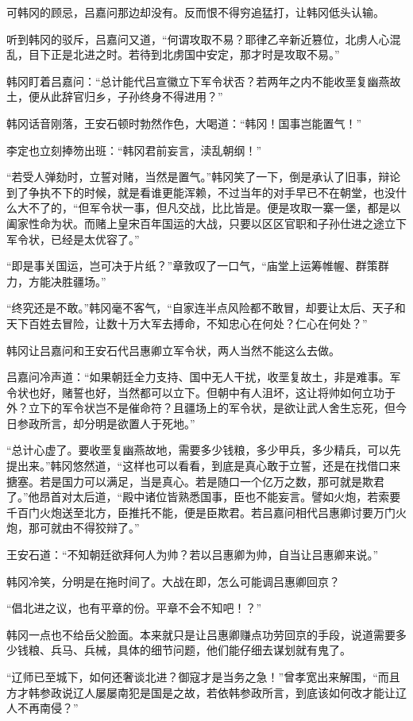 可韩冈的顾忌，吕嘉问那边却没有。反而恨不得穷追猛打，让韩冈低头认输。

听到韩冈的驳斥，吕嘉问又道，“何谓攻取不易？耶律乙辛新近篡位，北虏人心混乱，目下正是北进之时。若待到北虏国中安定，那才时是攻取不易。”

韩冈盯着吕嘉问：“总计能代吕宣徽立下军令状否？若两年之内不能收垩复幽燕故土，便从此辞官归乡，子孙终身不得进用？”

韩冈话音刚落，王安石顿时勃然作色，大喝道：“韩冈！国事岂能置气！”

李定也立刻捧笏出班：“韩冈君前妄言，渎乱朝纲！”

“若受人弹劾时，立誓对赌，当然是置气。”韩冈笑了一下，倒是承认了旧事，辩论到了争执不下的时候，就是看谁更能浑赖，不过当年的对手早已不在朝堂，也没什么大不了的，“但军令状一事，但凡交战，比比皆是。便是攻取一寨一堡，都是以阖家性命为状。而赌上皇宋百年国运的大战，只要以区区官职和子孙仕进之途立下军令状，已经是太优容了。”

“即是事关国运，岂可决于片纸？”章敦叹了一口气，“庙堂上运筹帷幄、群策群力，方能决胜疆场。”

“终究还是不敢。”韩冈毫不客气，“自家连半点风险都不敢冒，却要让太后、天子和天下百姓去冒险，让数十万大军去搏命，不知忠心在何处？仁心在何处？”

韩冈让吕嘉问和王安石代吕惠卿立军令状，两人当然不能这么去做。

吕嘉问冷声道：“如果朝廷全力支持、国中无人干扰，收垩复故土，非是难事。军令状也好，赌誓也好，当然都可以立下。但朝中有人沮坏，这让将帅如何立功于外？立下的军令状岂不是催命符？且疆场上的军令状，是欲让武人舍生忘死，但今日参政所言，却分明是欲置人于死地。”

“总计心虚了。要收垩复幽燕故地，需要多少钱粮，多少甲兵，多少精兵，可以先提出来。”韩冈悠然道，“这样也可以看看，到底是真心敢于立誓，还是在找借口来搪塞。若是国力可以满足，当是真心。若是随口一个亿万之数，那可就是欺君了。”他昂首对太后道，“殿中诸位皆熟悉国事，臣也不能妄言。譬如火炮，若索要千百门火炮送至北方，臣推托不能，便是臣欺君。若吕嘉问相代吕惠卿讨要万门火炮，那可就由不得狡辩了。”

王安石道：“不知朝廷欲拜何人为帅？若以吕惠卿为帅，自当让吕惠卿来说。”

韩冈冷笑，分明是在拖时间了。大战在即，怎么可能调吕惠卿回京？

“倡北进之议，也有平章的份。平章不会不知吧！？”

韩冈一点也不给岳父脸面。本来就只是让吕惠卿赚点功劳回京的手段，说道需要多少钱粮、兵马、兵械，具体的细节问题，他们能仔细去谋划就有鬼了。

“辽师已至城下，如何还奢谈北进？御寇才是当务之急！”曾孝宽出来解围，“而且方才韩参政说辽人屡屡南犯是国是之故，若依韩参政所言，到底该如何改才能让辽人不再南侵？”

